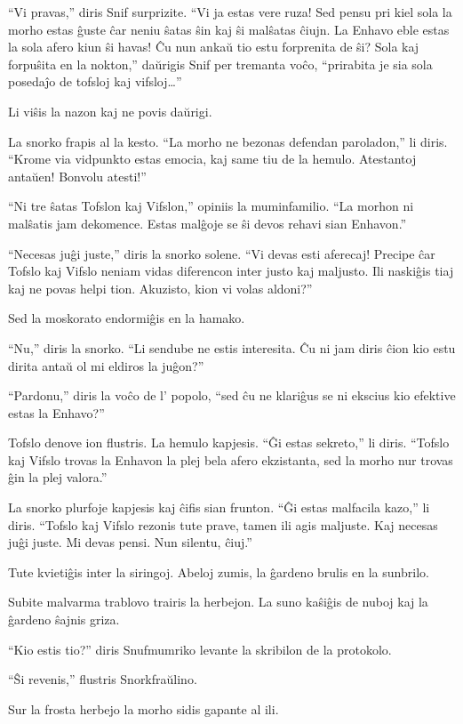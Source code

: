 ``Vi pravas,'' diris Snif surprizite. ``Vi ja estas vere ruza! Sed pensu pri kiel sola la morho estas ĝuste ĉar neniu ŝatas ŝin kaj ŝi malŝatas ĉiujn. La Enhavo eble estas la sola afero kiun ŝi havas! Ĉu nun ankaŭ tio estu forprenita de ŝi? Sola kaj forpuŝita en la nokton,'' daŭrigis Snif per tremanta voĉo, ``prirabita je sia sola posedaĵo de tofsloj kaj vifsloj{\ldots}''

Li viŝis la nazon kaj ne povis daŭrigi.

La snorko frapis al la kesto. ``La morho ne bezonas defendan paroladon,'' li diris. ``Krome via vidpunkto estas emocia, kaj same tiu de la hemulo. Atestantoj antaŭen! Bonvolu atesti!''

``Ni tre ŝatas Tofslon kaj Vifslon,'' opiniis la muminfamilio. ``La morhon ni malŝatis jam dekomence. Estas malĝoje se ŝi devos rehavi sian Enhavon.''

``Necesas juĝi juste,'' diris la snorko solene. ``Vi devas esti aferecaj! Precipe ĉar Tofslo kaj Vifslo neniam vidas diferencon inter justo kaj maljusto. Ili naskiĝis tiaj kaj ne povas helpi tion. Akuzisto, kion vi volas aldoni?''

Sed la moskorato endormiĝis en la hamako.

``Nu,'' diris la snorko. ``Li sendube ne estis interesita. Ĉu ni jam diris ĉion kio estu dirita antaŭ ol mi eldiros la juĝon?''

``Pardonu,'' diris la voĉo de l' popolo, ``sed ĉu ne klariĝus se ni ekscius kio efektive estas la Enhavo?''

Tofslo denove ion flustris. La hemulo kapjesis. ``Ĝi estas sekreto,'' li diris. ``Tofslo kaj Vifslo trovas la Enhavon la plej bela afero ekzistanta, sed la morho nur trovas ĝin la plej valora.''

La snorko plurfoje kapjesis kaj ĉifis sian frunton. ``Ĝi estas malfacila kazo,'' li diris. ``Tofslo kaj Vifslo rezonis tute prave, tamen ili agis maljuste. Kaj necesas juĝi juste. Mi devas pensi. Nun silentu, ĉiuj.''

Tute kvietiĝis inter la siringoj. Abeloj zumis, la ĝardeno brulis en la sunbrilo.

Subite malvarma trablovo trairis la herbejon. La suno kaŝiĝis de nuboj kaj la ĝardeno ŝajnis griza.

``Kio estis tio?'' diris Snufmumriko levante la skribilon de la protokolo.

``Ŝi revenis,'' flustris Snorkfraŭlino.

Sur la frosta herbejo la morho sidis gapante al ili.

